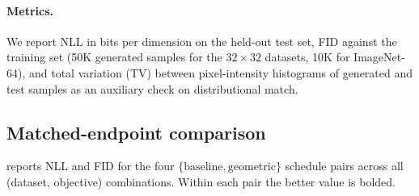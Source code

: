 \documentclass[11pt]{article}
\begin{document}
\paragraph{Metrics.} We report NLL in bits per dimension on the held-out test set, FID against the training set (50K generated samples for the \(32\times 32\) datasets, 10K for ImageNet-64), and total variation (TV) between pixel-intensity histograms of generated and test samples as an auxiliary check on distributional match.

\subsection{Matched-endpoint comparison}
\label{sec:exp_matched}

 reports NLL and FID for the four \(\{\text{baseline},\text{geometric}\}\) schedule pairs across all (dataset, objective) combinations. Within each pair the better value is bolded.
\end{document}
